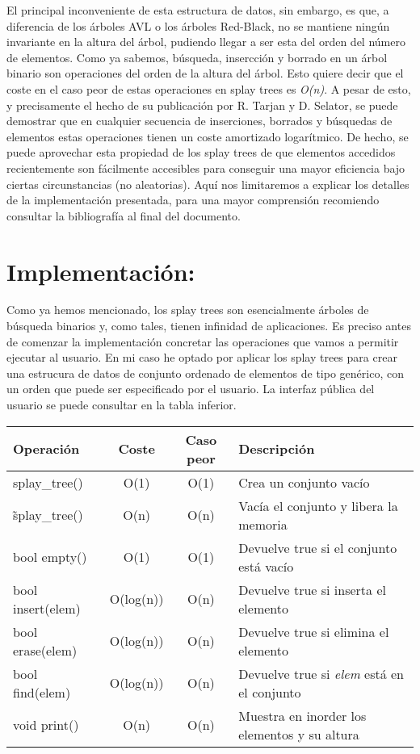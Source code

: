 \documentclass[letterpaper,12pt]{article}
\begin{document}
El principal inconveniente de esta estructura de datos, sin embargo, es que, 
a diferencia de los árboles AVL o los árboles Red-Black, no se mantiene 
ningún invariante en la altura del árbol, pudiendo llegar a ser esta del 
orden del número de elementos. Como ya sabemos, búsqueda, insercción y 
borrado en un árbol binario son operaciones del orden de la altura del árbol.
Esto quiere decir que el coste en el caso peor de estas operaciones en splay 
trees es \textit{O(n)}. A pesar de esto, y precisamente el hecho de su 
publicación por R. Tarjan y D. Selator, se puede demostrar que en cualquier 
secuencia de inserciones, borrados y búsquedas de elementos estas operaciones
tienen un coste amortizado logarítmico. De hecho, se puede aprovechar esta 
propiedad de los splay trees de que elementos accedidos recientemente son 
fácilmente accesibles para conseguir una mayor eficiencia bajo ciertas 
circunstancias (no aleatorias). Aquí nos limitaremos a explicar los detalles 
de la implementación presentada, para una mayor comprensión recomiendo 
consultar la bibliografía al final del documento.


\section{Implementación:}

Como ya hemos mencionado, los splay trees son esencialmente árboles de
búsqueda binarios y, como tales, tienen infinidad de aplicaciones. Es preciso
antes de comenzar la implementación concretar las operaciones que vamos a 
permitir ejecutar al usuario. En mi caso he optado por aplicar los splay 
trees para crear una estrucura de datos de conjunto ordenado de elementos de
tipo genérico, con un orden que puede ser especificado por el usuario.
La interfaz pública del usuario se puede consultar en la tabla inferior.

\begin{center}
\begin{tabular}{|l|c|c|l|}

	\hline
	Operación & Coste & Caso peor & Descripción\\
	\hline
    splay\_tree()    & O(1)     &  O(1)& Crea un conjunto vacío\\
	\hline
    \~splay\_tree()  & O(n)     & O(n) & Vacía el conjunto y libera la memoria\\ 
	\hline
	bool empty()     & O(1)     & O(1) & Devuelve true si el conjunto está vacío\\
	\hline
	bool insert(elem)& O(log(n))& O(n) & Devuelve true si inserta el elemento\\
	\hline
	bool erase(elem) & O(log(n))& O(n) & Devuelve true si elimina el elemento\\
	\hline
	bool find(elem)  & O(log(n))& O(n) & Devuelve true si \textit{elem} está en el conjunto\\
	\hline
	void print()     & O(n)     & O(n) & Muestra en inorder los elementos y su altura\\
	\hline
	
\end{tabular}
\end{center}
\end{document}
